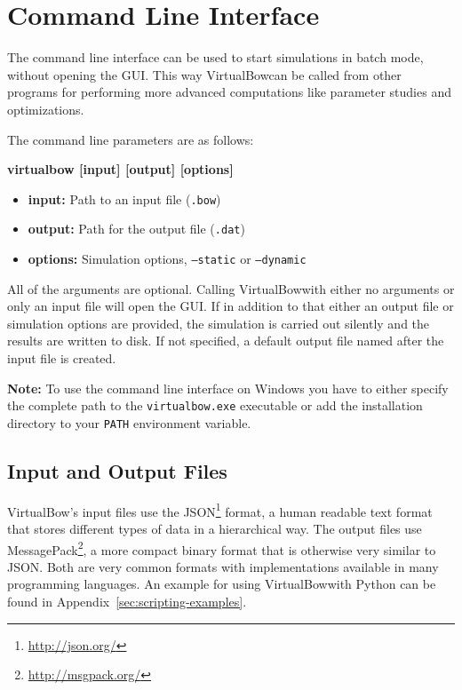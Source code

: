 \documentclass[12pt]{article}
\newcommand{\swtitle}{VirtualBow}
\begin{document}
\newpage
\section{Command Line Interface}

The command line interface can be used to start simulations in batch mode, without opening the GUI.
This way \swtitle can be called from other programs for performing more advanced computations like parameter studies and optimizations.

The command line parameters are as follows:

\smallskip

\begin{framed}
\textbf{virtualbow [input] [output] [options]}
\end{framed}

\begin{itemize}
\item \textbf{input:} Path to an input file (\texttt{.bow})
\item \textbf{output:} Path for the output file (\texttt{.dat})
\item \textbf{options:} Simulation options, \texttt{--static} or \texttt{--dynamic}
\end{itemize}

\smallskip

All of the arguments are optional.
Calling \swtitle with either no arguments or only an input file will open the GUI.
If in addition to that either an output file or simulation options are provided, the simulation is carried out silently and the results are written to disk.
If not specified, a default output file named after the input file is created.

\textbf{Note:} To use the command line interface on Windows you have to either specify the complete path to the \texttt{virtualbow.exe} executable or add the installation directory to your \texttt{PATH} environment variable.

\subsection*{Input and Output Files}

\swtitle's input files use the JSON\footnote{\url{http://json.org/}} format, a human readable text format that stores different types of data in a hierarchical way.
The output files use MessagePack\footnote{\url{http://msgpack.org/}}, a more compact binary format that is otherwise very similar to JSON.
Both are very common formats with implementations available in many programming languages.
An example for using \swtitle with Python can be found in Appendix~\ref{sec:scripting-examples}.
\end{document}

